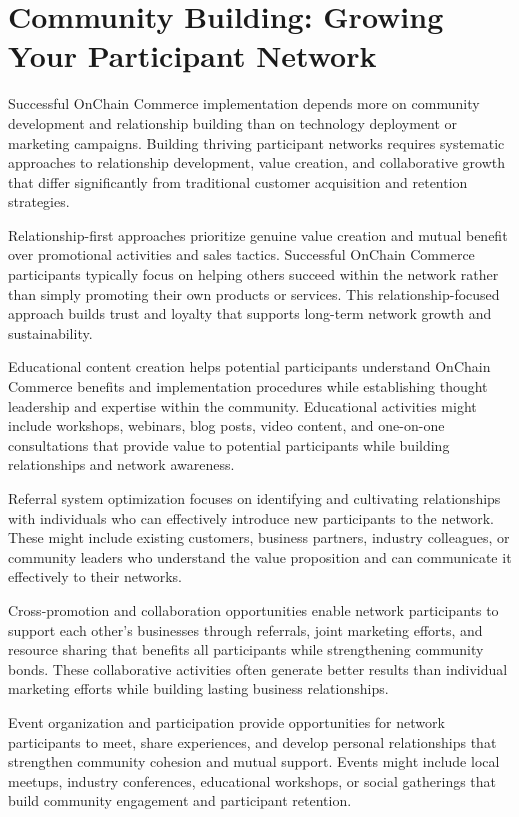 \documentclass[
  Letterpaper,
]{scrbook}
\begin{document}
\section{Community Building: Growing Your Participant
Network}\label{community-building-growing-your-participant-network}

Successful OnChain Commerce implementation depends more on community
development and relationship building than on technology deployment or
marketing campaigns. Building thriving participant networks requires
systematic approaches to relationship development, value creation, and
collaborative growth that differ significantly from traditional customer
acquisition and retention strategies.

Relationship-first approaches prioritize genuine value creation and
mutual benefit over promotional activities and sales tactics. Successful
OnChain Commerce participants typically focus on helping others succeed
within the network rather than simply promoting their own products or
services. This relationship-focused approach builds trust and loyalty
that supports long-term network growth and sustainability.

Educational content creation helps potential participants understand
OnChain Commerce benefits and implementation procedures while
establishing thought leadership and expertise within the community.
Educational activities might include workshops, webinars, blog posts,
video content, and one-on-one consultations that provide value to
potential participants while building relationships and network
awareness.

Referral system optimization focuses on identifying and cultivating
relationships with individuals who can effectively introduce new
participants to the network. These might include existing customers,
business partners, industry colleagues, or community leaders who
understand the value proposition and can communicate it effectively to
their networks.

Cross-promotion and collaboration opportunities enable network
participants to support each other's businesses through referrals, joint
marketing efforts, and resource sharing that benefits all participants
while strengthening community bonds. These collaborative activities
often generate better results than individual marketing efforts while
building lasting business relationships.

Event organization and participation provide opportunities for network
participants to meet, share experiences, and develop personal
relationships that strengthen community cohesion and mutual support.
Events might include local meetups, industry conferences, educational
workshops, or social gatherings that build community engagement and
participant retention.
\end{document}
